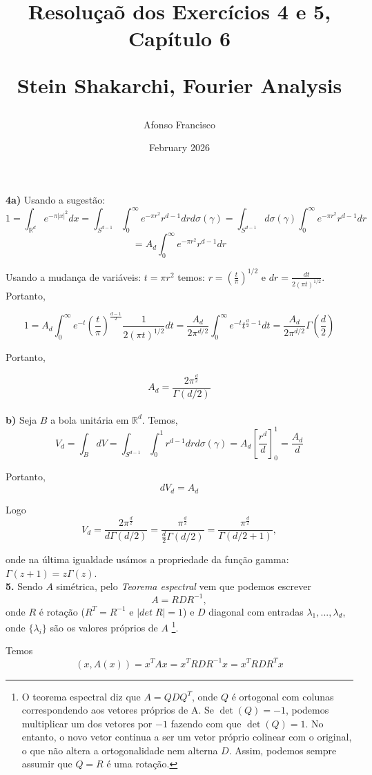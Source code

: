 \documentclass{article}
\title{Resoluçaõ dos Exercícios 4 e 5, Capítulo 6

Stein Shakarchi, Fourier Analysis}
\author{Afonso Francisco }
\date{February 2026}
\begin{document}
\maketitle

\textbf{4a)}
Usando a sugestão:
$$1=
\int_{\mathbb{R}^d} e^{-\pi |x|^2}dx=
\int_{S^{d-1}}\int_0^\infty e^{-\pi r^2}r^{d-1}drd\sigma(\gamma)=
\int_{S^{d-1}}d\sigma(\gamma) \int_0^\infty e^{-\pi r^2}r^{d-1}dr$$
$$=A_d \int_0^\infty e^{-\pi r^2}r^{d-1}dr$$

Usando a mudança de variáveis: $t=\pi r^2$ temos: $r=(\frac{t}{\pi})^{1/2}$ e $dr=\frac{dt}{2(\pi t)^{1/2}}$. Portanto,

$$1=
A_d\int_0^\infty e^{-t} \left( \frac{t}{\pi} \right)^{\frac{d-1}{2}} \frac{1}{2(\pi t)^{1/2}} dt=
\frac{A_d}{2\pi^{d/2}}\int_0^\infty e^{-t}t^{\frac{d}{2}-1}dt=
\frac{A_d}{2\pi^{d/2}}\Gamma\left(\frac{d}{2}\right)$$

Portanto,

$$A_d=\frac{2\pi^{\frac{d}{2}}}{\Gamma\left( d/2 \right)}$$\\

\textbf{b)}
Seja $B$ a bola unitária em $\mathbb{R}^d$. Temos,
$$V_d=
\int_BdV=
\int_{S^{d-1}}\int_0^1 r^{d-1}drd\sigma(\gamma)=A_d \left[ \frac{r^d}{d} \right]_0^1=\frac{A_d}{d}$$

Portanto, $$dV_d=A_d$$

Logo $$V_d=\frac{2\pi^{\frac{d}{2}}}{d\Gamma\left( d/2 \right)}=
\frac{\pi^{\frac{d}{2}}}{\frac{d}{2}\Gamma\left( d/2 \right)}=
\frac{\pi^{\frac{d}{2}}}{\Gamma\left( d/2+1 \right)},$$

onde na última igualdade usámos a propriedade da função gamma: $\Gamma(z+1)=z\Gamma(z)$.\\


\textbf{5.} Sendo $A$ simétrica, pelo \textit{Teorema espectral} vem que podemos escrever 
$$A=RDR^{-1},$$
onde $R$ é rotação ($R^T=R^{-1}$ e $|det \;R|=1$) e $D$ diagonal com entradas $\lambda_1,...,\lambda_d$, onde $\{\lambda_i\}$ são os valores próprios de $A$
\footnote{O teorema espectral diz que $A=QDQ^T$, onde $Q$ é ortogonal com colunas correspondendo aos vetores próprios de A.
Se $\det(Q)=-1$, podemos multiplicar um dos vetores por $-1$ fazendo com que $\det(Q)=1$. No entanto, o novo vetor continua a ser um vetor próprio colinear com o original, o que não altera a ortogonalidade nem alterna $D$. Assim, podemos sempre assumir que $Q=R$ é uma rotação.}.

Temos 
$$(x,A(x))=
x^TAx=x^TRDR^{-1}x=
x^TRDR^Tx$$
\end{document}
